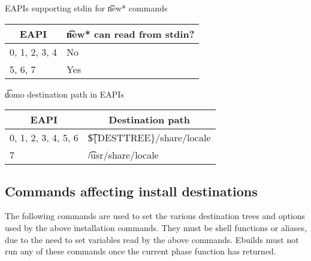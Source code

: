 \begin{centertable}{EAPIs supporting stdin for \t{new*} commands}
    \label{tab:newfoo-stdin-table}
    \begin{tabular}{ll}
      \toprule
      \multicolumn{1}{c}{\textbf{EAPI}} &
      \multicolumn{1}{c}{\textbf{\t{new*} can read from stdin?}} \\
      \midrule
      0, 1, 2, 3, 4     & No  \\
      5, 6, 7           & Yes \\
      \bottomrule
    \end{tabular}
\end{centertable}

\begin{centertable}{\t{domo} destination path in EAPIs}
    \label{tab:domo-path}
    \begin{tabular}{ll}
      \toprule
      \multicolumn{1}{c}{\textbf{EAPI}} &
      \multicolumn{1}{c}{\textbf{Destination path}} \\
      \midrule
      0, 1, 2, 3, 4, 5, 6 & \t{\$\{DESTTREE\}/share/locale} \\
      7                   & \t{/usr/share/locale} \\
      \bottomrule
    \end{tabular}
\end{centertable}

\subsection{Commands affecting install destinations}
The following commands are used to set the various destination trees and options used by the above
installation commands. They must be shell functions or aliases, due to the need to set variables
read by the above commands. Ebuilds must not run any of these commands once the current phase
function has returned.

